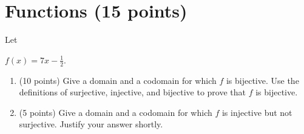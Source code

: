 \documentclass[11pt]{article}
\def\R{\mathbb{R}}
\def\Q{\mathbb{Q}}
\def\Z{\mathbb{Z}}
\def\sectionOneA#1{}
\def\sectionOneB#1{}
\def\sectionTwoA#1{}
\def\sectionTwoB#1{}
\def\sectionVicsection#1{#1}
\newcounter{pgpts}
\newcounter{cumpts}
\newcommand{\cnewpage}{\addtocounter{cumpts}{\value{pgpts}}\newpage\setcounter{pgpts}{0}}
\begin{document}



\section{Functions (15 points)}\addtocounter{pgpts}{15}


Let
\sectionOneA{$f(x)=\frac{x-1}{3}$\;.}
\sectionOneB{$f(x)=\frac{x-1}{2}$\;.} %
\sectionTwoA{$f(x)=5x+2$\;.}
\sectionTwoB{$f(x)=2x+5$\;.} %
\sectionVicsection{$f(x)=7x-\frac{1}{2}$\;.}
  \begin{enumerate}
    \item (10 points) Give a domain and a codomain for which $f$ is bijective. Use the definitions of surjective, injective, and bijective to prove that $f$ is bijective.
       \vspace*{10cm}
    \item (5 points) Give a domain and a codomain for which $f$ is injective but not surjective. Justify your answer shortly.
  \end{enumerate}







  
\end{document}
